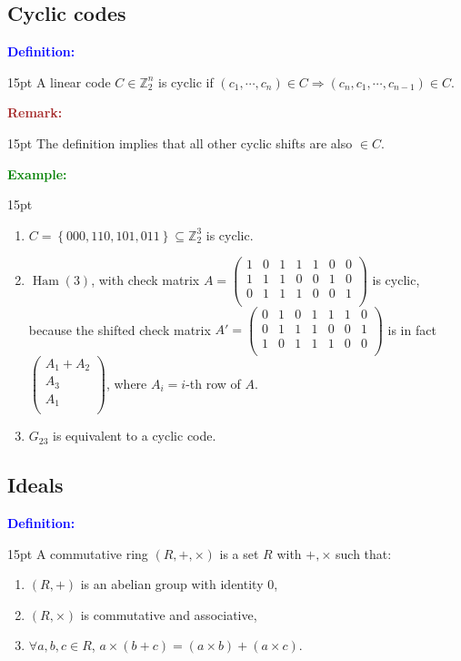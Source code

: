 \documentclass[12pt]{article}
\newcommand{\noparskip}{\vspace{-\parskip}}
\newenvironment{points}
	{\begin{enumerate}[label = (\arabic*)]}
	{\end{enumerate}}
\newenvironment{dent}
	{\begin{adjustwidth}{15pt}{}\noparskip}
	{\end{adjustwidth}}
\newenvironment{definition}
	{\textcolor{Blue}{\textbf{Definition:}}\begin{dent}}
	{\end{dent}}
\newenvironment{example}
	{\textcolor{Green}{\textbf{Example:}}\begin{dent}}
	{\end{dent}}
\newenvironment{remark}
	{\textcolor{Brown}{\textbf{Remark:}}\begin{dent}}
	{\end{dent}}
\renewcommand{\implies}{\Rightarrow}
\newcommand{\set}[1]{\left\{ #1 \right\}}
\newcommand{\Z}{\mathbb{Z}}
\newcommand{\Ham}[1]{\operatorname{Ham}(#1)}
\begin{document}
\subsection{Cyclic codes}

\begin{definition}
A linear code $C \in \Z_2^n$ is cyclic if $(c_1, \cdots, c_n) \in C \implies (c_n, c_1, \cdots, c_{n - 1}) \in C$.
\end{definition}

\begin{remark}
The definition implies that all other cyclic shifts are also $\in C$.
\end{remark}

\begin{example}
\begin{points}
\item $C = \set{000, 110, 101, 011} \subseteq \Z_2^3$ is cyclic.
\item $\Ham{3}$, with check matrix $A = \begin{pmatrix}
1 & 0 & 1 & 1 & 1 & 0 & 0 \\
1 & 1 & 1 & 0 & 0 & 1 & 0 \\
0 & 1 & 1 & 1 & 0 & 0 & 1 \\
\end{pmatrix}$ is cyclic, because the shifted check matrix $A' = \begin{pmatrix}
0 & 1 & 0 & 1 & 1 & 1 & 0 \\
0 & 1 & 1 & 1 & 0 & 0 & 1 \\
1 & 0 & 1 & 1 & 1 & 0 & 0 \\
\end{pmatrix}$ is in fact $\begin{pmatrix} A_1 + A_2 \\ A_3 \\ A_1 \\ \end{pmatrix}$, where $A_i = i$-th row of $A$.
\item $G_{23}$ is equivalent to a cyclic code.
\end{points}
\end{example}

\subsection{Ideals}

\begin{definition}
A commutative ring $(R, +, \times)$ is a set $R$ with $+, \times$ such that:
\noparskip
\begin{points}
\item $(R, +)$ is an abelian group with identity 0,
\item $(R, \times)$ is commutative and associative,
\item $\forall a, b, c \in R$, $a \times (b + c) = (a \times b) + (a \times c)$.
\end{points}
\end{definition}
\end{document}
